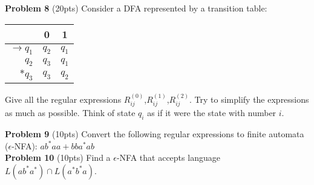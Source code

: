\documentclass{article}
\begin{document}
\noindent \textbf{Problem 8} (20pts) Consider a DFA represented by a transition table:
\begin{center}
\small
\begin{tabular}{r|c|c}
& 0 & 1 \\ \hline
$\rightarrow q_1$ & $q_2$ & $q_1$ \\ 
$q_2$ & $q_3$ & $q_1$ \\ 
$*q_3$ & $q_3$ & $q_2$
\end{tabular}
\end{center}
Give all the regular expressions $R^{(0)}_{ij}$,$R^{(1)}_{ij}$,$R^{(2)}_{ij}$. Try to simplify the expressions as much as possible.
Think of state $q_i$ as if it were the state with number $i$.

\noindent \newline \textbf{Problem 9} (10pts) Convert the following regular expressions to finite automata ($\epsilon$-NFA): $ab^*aa+bba^*ab$ \\

\noindent \textbf{Problem 10} (10pts) Find a $\epsilon$-NFA that accepts language $L(ab^*a^*)\cap L(a^*b^*a)$.
\end{document}

